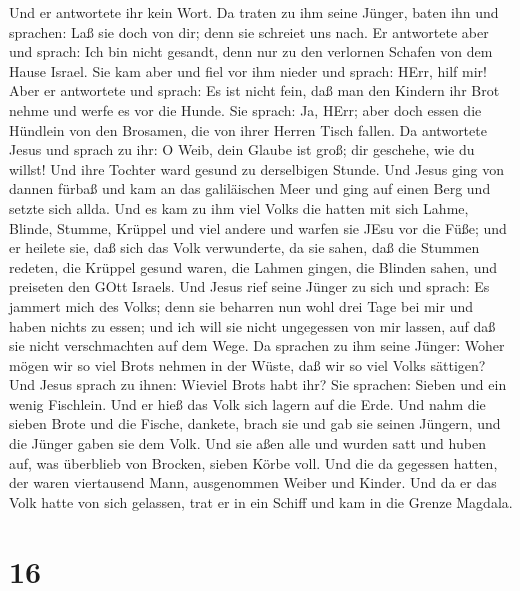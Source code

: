  Und er antwortete ihr kein Wort. Da traten zu ihm seine
Jünger, baten ihn und sprachen: Laß sie doch von dir; denn sie schreiet
uns nach.  Er antwortete aber und sprach: Ich bin nicht
gesandt, denn nur zu den verlornen Schafen von dem Hause Israel.
 Sie kam aber und fiel vor ihm nieder und sprach: HErr,
hilf mir!  Aber er antwortete und sprach: Es ist nicht
fein, daß man den Kindern ihr Brot nehme und werfe es vor die Hunde.
 Sie sprach: Ja, HErr; aber doch essen die Hündlein von den
Brosamen, die von ihrer Herren Tisch fallen.  Da antwortete
Jesus und sprach zu ihr: O Weib, dein Glaube ist groß; dir geschehe, wie
du willst! Und ihre Tochter ward gesund zu derselbigen Stunde.
 Und Jesus ging von dannen fürbaß und kam an das
galiläischen Meer und ging auf einen Berg und setzte sich allda.
 Und es kam zu ihm viel Volks die hatten mit sich Lahme,
Blinde, Stumme, Krüppel und viel andere und warfen sie JEsu vor die
Füße; und er heilete sie,  daß sich das Volk verwunderte,
da sie sahen, daß die Stummen redeten, die Krüppel gesund waren, die
Lahmen gingen, die Blinden sahen, und preiseten den GOtt Israels.
 Und Jesus rief seine Jünger zu sich und sprach: Es jammert
mich des Volks; denn sie beharren nun wohl drei Tage bei mir und haben
nichts zu essen; und ich will sie nicht ungegessen von mir lassen, auf
daß sie nicht verschmachten auf dem Wege.  Da sprachen zu
ihm seine Jünger: Woher mögen wir so viel Brots nehmen in der Wüste, daß
wir so viel Volks sättigen?  Und Jesus sprach zu ihnen:
Wieviel Brots habt ihr? Sie sprachen: Sieben und ein wenig Fischlein.
 Und er hieß das Volk sich lagern auf die Erde.
 Und nahm die sieben Brote und die Fische, dankete, brach
sie und gab sie seinen Jüngern, und die Jünger gaben sie dem Volk.
 Und sie aßen alle und wurden satt und huben auf, was
überblieb von Brocken, sieben Körbe voll.  Und die da
gegessen hatten, der waren viertausend Mann, ausgenommen Weiber und
Kinder.  Und da er das Volk hatte von sich gelassen, trat
er in ein Schiff und kam in die Grenze Magdala.

\hypertarget{section-15}{%
\section{16}\label{section-15}}

